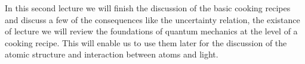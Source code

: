 In this second lecture we will finish the discussion of the basic cooking recipes and discuss a few of the consequences like the uncertainty relation, the existance of  lecture we will review the foundations of quantum mechanics at the level of a cooking recipe. This will enable us to use them later for the discussion of the atomic structure and interaction between atoms and light.